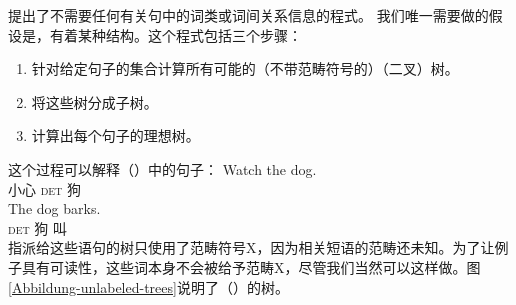 \mbox{} \citet{Bod2009a}提出了不需要任何有关句中的词类或词间关系信息的程式。
我们唯一需要做的假设是，有着某种结构。这个程式包括三个步骤：
\begin{enumerate}
\item 针对给定句子的集合计算所有可能的（不带范畴符号的）（二叉）树。
\item 将这些树分成子树。
\item 计算出每个句子的理想树。
\end{enumerate}
这个过程可以解释（）中的句子：
\eal
\ex 
\gll Watch the dog.\\
小心 \textsc{det} 狗\\
\ex 
\gll The dog barks.\\
\textsc{det} 狗 叫\\
\zl
指派给这些语句的树只使用了范畴符号X，因为相关短语的范畴还未知。为了让例子具有可读性，这些词本身不会被给予范畴X，尽管我们当然可以这样做。图\vref{Abbildung-unlabeled-trees}说明了（）的树。
